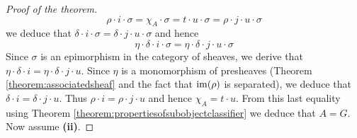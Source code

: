 \begin{proof}[Proof of the theorem]
$$\rho\cdot i\cdot \sigma = \chi_A\cdot \sigma = t\cdot u\cdot \sigma = \rho\cdot j\cdot u\cdot \sigma$$
we deduce that $\delta \cdot i\cdot \sigma = \delta\cdot j\cdot u\cdot \sigma$ and hence
$$\eta\cdot \delta\cdot i \cdot \sigma = \eta\cdot \delta\cdot j\cdot u\cdot \sigma$$
Since $\sigma$ is an epimorphism in the category of sheaves, we derive that $\eta\cdot \delta \cdot i = \eta\cdot \delta\cdot j\cdot u$. Since $\eta$ is a monomorphism of presheaves (Theorem \ref{theorem:associatedsheaf} and the fact that $\mathrm{im}(\rho)$ is separated), we deduce that $\delta\cdot i = \delta \cdot j\cdot u$. Thus $\rho \cdot i = \rho\cdot j\cdot u$ and hence $\chi_A = t\cdot u$. From this last equality using Theorem \ref{theorem:propertiesofsubobjectclassifier} we deduce that $A = G$.\\
Now assume \textbf{(ii)}.
\end{proof}


\small



